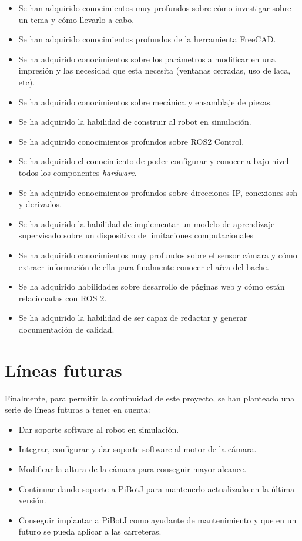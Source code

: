 \begin{itemize}
	\item Se han adquirido conocimientos muy profundos sobre cómo investigar sobre un tema y cómo llevarlo a cabo.
	\item Se han adquirido conocimientos profundos de la herramienta FreeCAD.
	\item Se ha adquirido conocimientos sobre los parámetros a modificar en una impresión y las necesidad que esta necesita (ventanas cerradas, uso de laca, etc).
	\item Se ha adquirido conocimientos sobre mecánica y ensamblaje de piezas. 
	\item Se ha adquirido la habilidad de construir al robot en simulación.
	\item Se ha adquirido conocimientos profundos sobre ROS2 Control.
	\item Se ha adquirido el conocimiento de poder configurar y conocer a bajo nivel todos los componentes \textit{hardware}.
	\item Se ha adquirido conocimientos profundos sobre direcciones IP, conexiones ssh y derivados.
	\item Se ha adquirido la habilidad de implementar un modelo de aprendizaje supervisado sobre un dispositivo de limitaciones computacionales
	\item Se ha adquirido conocimientos muy profundos sobre el sensor cámara y cómo extraer información de ella para finalmente conocer el aŕea del bache. 
	\item Se ha adquirido habilidades sobre desarrollo de páginas web y cómo están relacionadas con ROS 2.
	\item Se ha adquirido la habilidad de ser capaz de redactar y generar documentación de calidad.
\end{itemize}
 


\section{Líneas futuras}

Finalmente, para permitir la continuidad de este proyecto, se han planteado una serie de líneas futuras a tener en cuenta: 

\begin{itemize}
	\item Dar soporte software al robot en simulación. 
	\item Integrar, configurar y dar soporte software al motor de la cámara.
	\item Modificar la altura de la cámara para conseguir mayor alcance.
	\item Continuar dando soporte a PiBotJ para mantenerlo actualizado en la última versión.
	\item Conseguir implantar a PiBotJ como ayudante de mantenimiento y que en un futuro se pueda aplicar a las carreteras.
\end{itemize}

